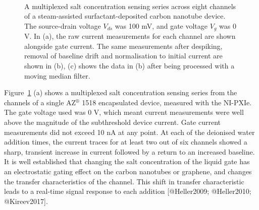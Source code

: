 \documentclass[
  letterpaper,
  DIV=11,
  numbers=noendperiod]{scrartcl}
\begin{document}
\begin{figure}
\begin{minipage}[t]{0.70\linewidth}
{{}

}

\end{minipage}%
%
\begin{minipage}[t]{0.15\linewidth}

{\centering 

~

}

\end{minipage}%

\caption{\label{fig-salt-conc-sensing}A multiplexed salt concentration
sensing series across eight channels of a steam-assisted
surfactant-deposited carbon nanotube device. The source-drain voltage
\(V_{ds}\) was 100 mV, and gate voltage \(V_g\) was 0 V. In (a), the raw
current measurements for each channel are shown alongside gate current.
The same measurements after despiking, removal of baseline drift and
normalisation to initial current are shown in (b), (c) shows the data in
(b) after being processed with a moving median filter.}

\end{figure}

Figure~\ref{fig-salt-conc-sensing} (a) shows a multiplexed salt
concentration sensing series from the channels of a single
AZ\(^\circledR\) 1518 encapsulated device, measured with the NI-PXIe.
The gate voltage used was 0 V, which meant current measurements were
well above the magnitude of the subthreshold device current. Gate
current measurements did not exceed 10 nA at any point. At each of the
deionised water addition times, the current traces for at least two out
of six channels showed a sharp, transient increase in current followed
by a return to an increased baseline. It is well established that
changing the salt concentration of the liquid gate has an electrostatic
gating effect on the carbon nanotubes or graphene, and changes the
transfer characteristics of the channel. This shift in transfer
characteristic leads to a real-time signal response to each addition
{[}@Heller2009; @Heller2010; @Kireev2017{]}.
\end{document}
